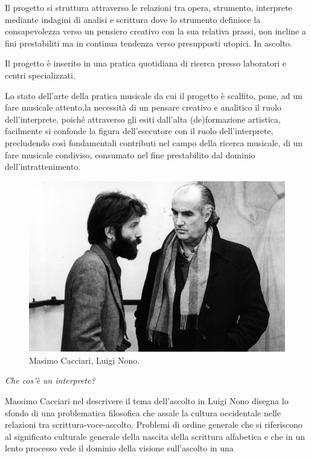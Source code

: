 \documentclass{gs-adonis}
\begin{document}
Il progetto si struttura attraverso le relazioni tra opera, strumento,
interprete mediante indagini di analisi e scrittura dove lo strumento definisce
la consapevolezza verso un pensiero creativo con la sua relativa prassi, non
incline a fini prestabiliti ma in continua tendenza verso presupposti utopici.
In ascolto.

Il progetto è inserito in una pratica quotidiana di ricerca presso laboratori
e centri specializzati.

Lo stato dell'arte della pratica musicale da cui il progetto è scalfito, pone,
ad un fare musicale attento,la necessità di un pensare creativo e analitico il
ruolo dell'interprete, poiché attraverso gli esiti dall'alta (de)formazione
artistica, facilmente si confonde la figura dell'esecutore con il ruolo
dell'interprete, precludendo così fondamentali contributi nel campo della
ricerca musicale, di un fare musicale condiviso, consumato nel fine
prestabilito dal dominio dell'intrattenimento.

\begin{figure}[ht]
  \centering
  \includegraphics[width=\linewidth]{images/luigi-nono-massimo-cacciari.jpg}
  \captionsetup{width=.81\linewidth}
  \caption{Masimo Cacciari, Luigi Nono.}
  \label{cacciari}
\end{figure}



\emph{Che cos'è un interprete?}

Massimo Cacciari nel descrivere il tema dell'ascolto in Luigi Nono \cite{Cacciari1995} disegna lo sfondo di una problematica filosofica che assale
la cultura occidentale nelle relazioni tra scrittura-voce-ascolto. Problemi di ordine generale che si riferiscono al significato culturale generale della nascita della scrittura alfabetica e che in un lento processo vede il dominio della visione sull'ascolto in una
\end{document}
